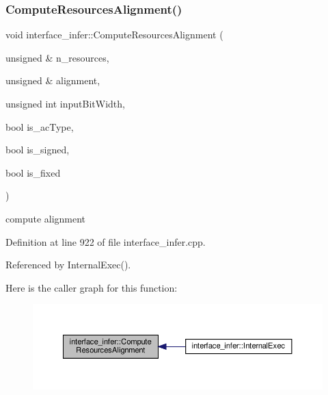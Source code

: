 \subsubsection{\texorpdfstring{Compute\+Resources\+Alignment()}{ComputeResourcesAlignment()}}
{\footnotesize\ttfamily void interface\+\_\+infer\+::\+Compute\+Resources\+Alignment (\begin{DoxyParamCaption}\item[{unsigned \&}]{n\+\_\+resources,  }\item[{unsigned \&}]{alignment,  }\item[{unsigned int}]{input\+Bit\+Width,  }\item[{bool}]{is\+\_\+ac\+Type,  }\item[{bool}]{is\+\_\+signed,  }\item[{bool}]{is\+\_\+fixed }\end{DoxyParamCaption})\hspace{0.3cm}{\ttfamily [private]}}

compute alignment 

Definition at line 922 of file interface\+\_\+infer.\+cpp.



Referenced by Internal\+Exec().

Here is the caller graph for this function\+:
\nopagebreak
\begin{figure}[H]
\begin{center}
\leavevmode
\includegraphics[width=350pt]{d9/d8a/classinterface__infer_ab4aeabadb7b03a53d0605a3cc88fe6df_icgraph}
\end{center}
\end{figure}
\mbox{\label{classinterface__infer_a99d0aeddc3181d958d1ecc3df7f298a7}} 
